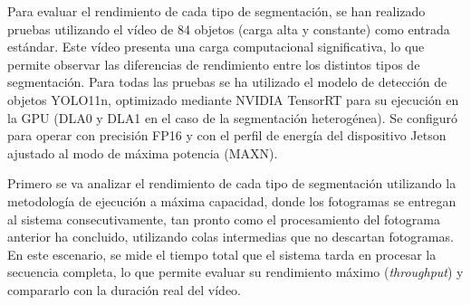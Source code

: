 \documentclass[11pt,spanish,listoffigures,listoftables]{tfgetsinf}
\begin{document}
Para evaluar el rendimiento de cada tipo de segmentación, se han realizado pruebas utilizando el vídeo de 84 objetos (carga alta y constante) como entrada estándar. Este vídeo presenta una carga computacional significativa, lo que permite observar las diferencias de rendimiento entre los distintos tipos de segmentación. Para todas las pruebas se ha utilizado el modelo de detección de objetos YOLO11n, optimizado mediante NVIDIA TensorRT para su ejecución en la GPU (DLA0 y DLA1 en el caso de la segmentación heterogénea). Se configuró para operar con precisión FP16 y con el perfil de energía del dispositivo Jetson ajustado al modo de máxima potencia (MAXN).


Primero se va analizar el rendimiento de cada tipo de segmentación utilizando la metodología de ejecución a máxima capacidad, donde los fotogramas se entregan al sistema consecutivamente, tan pronto como el procesamiento del fotograma anterior ha concluido, utilizando colas intermedias que no descartan fotogramas. En este escenario, se mide el tiempo total que el sistema tarda en procesar la secuencia completa, lo que permite evaluar su rendimiento máximo (\textit{throughput}) y compararlo con la duración real del vídeo.
\end{document}
